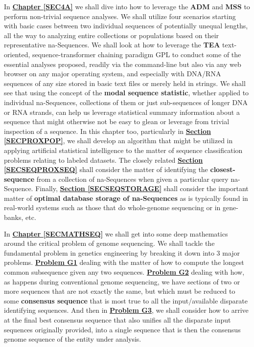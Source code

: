 \documentclass[a4paper, 18pt]{book} %
\begin{document}
In \textbf{\hyperref[SEC4A]{Chapter \ref{SEC4A}}} we shall dive into how to leverage the \textbf{ADM} and \textbf{MSS} to perform non-trivial sequence analyses. We shall utilize four scenarios starting with basic cases between two individual sequences of potentially unequal lengths, all the way to analyzing entire collections or populations based on their representative na-Sequences. We shall look at how to leverage the \textbf{TEA}\cite{Lutalo2024_taz}\cite{cli_tttt} text-oriented, sequence-transformer chaining paradigm GPL to conduct some of the essential analyses proposed, readily via the command-line but also via any web browser on any major operating system, and especially with DNA/RNA sequences of any size stored in basic text files or merely held in strings. We shall see that using the concept of the \textbf{modal sequence statistic}, whether applied to individual na-Sequences, collections of them or just sub-sequences of longer DNA or RNA strands, can help us leverage statistical summary information about a sequence that might otherwise not be easy to glean or leverage from trivial inspection of a sequence. In this chapter too, particularly in \textbf{\hyperref[SECPROXPOP]{Section \ref{SECPROXPOP}}}, we shall develop an algorithm that might be utilized in applying artificial statistical intelligence to the matter of sequence classification problems relating to labeled datasets. The closely related \textbf{\hyperref[SECSEQPROXSEQ]{Section \ref{SECSEQPROXSEQ}}} shall consider the matter of identifying the \textbf{closest-sequence} from a collection of na-Sequences when given a particular query na-Sequence. Finally, \textbf{\hyperref[SECSEQSTORAGE]{Section \ref{SECSEQSTORAGE}}} shall consider the important matter of \textbf{optimal database storage of na-Sequences} as is typically found in real-world systems such as those that do whole-genome sequencing or in gene-banks, etc. 

In \textbf{\hyperref[SECMATHSEQ]{Chapter \ref{SECMATHSEQ}}} we shall get into some deep mathematics around the critical problem of genome sequencing. We shall tackle the fundamental problem in genetics engineering by breaking it down into 3 major problems. \textbf{\hyperref[PROBG1]{Problem G1}} dealing with the matter of how to compute the longest common subsequence given any two sequences. \textbf{\hyperref[PROBG2]{Problem G2}} dealing with how, as happens during conventional genome sequencing, we have sections of two or more sequences that are not exactly the same, but which must be reduced to some \textbf{consensus sequence} that is most true to all the input/available disparate identifying sequences. And then in \textbf{\hyperref[SECCOMPGENSEQ]{Problem G3}}, we shall consider how to arrive at the final best consensus sequence that also unifies all the disparate input sequences originally provided, into a single sequence that is then the consensus genome sequence of the entity under analysis.
\end{document}

